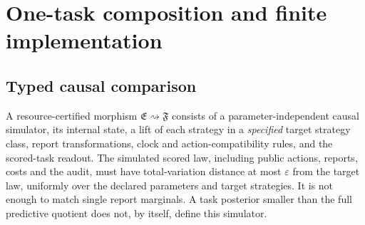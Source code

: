 \section{One-task composition and finite implementation}\label{sec:resources}
\subsection{Typed causal comparison}
A resource-certified morphism $\mathfrak E\rightsquigarrow\mathfrak F$ consists of a parameter-independent causal simulator, its internal state, a lift of each strategy in a \emph{specified} target strategy class, report transformations, clock and action-compatibility rules, and the scored-task readout. The simulated scored law, including public actions, reports, costs and the audit, must have total-variation distance at most $\varepsilon$ from the target law, uniformly over the declared parameters and target strategies. It is not enough to match single report marginals. A task posterior smaller than the full predictive quotient does not, by itself, define this simulator.

